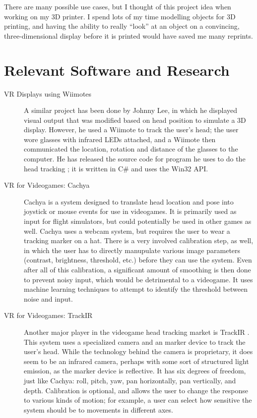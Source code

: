 There are many possible use cases, but I thought of this project idea
when working on my 3D printer. I spend lots of my time modelling
objects for 3D printing, and having the ability to really ``look'' at
an object on a convincing, three-dimensional display before it is
printed would have saved me many reprints.

\section{Relevant Software and Research}
\label{sec:sources}
\begin{description}
\item[VR Displays using Wiimotes] A similar project has been done by
  Johnny Lee, in which he displayed visual output that was modified
  based on head position to simulate a 3D display. However, he used a
  Wiimote to track the user's head; the user wore glasses with
  infrared LEDs attached, and a Wiimote then communicated the
  location, rotation and distance of the glasses to the computer. He
  has released the source code for program he uses to do the head
  tracking \citep{wiiproject}; it is written in C\# and uses the
  Win32 API.

\item[VR for Videogames: Cachya] Cachya \citep{cachya} is a system
  designed to translate head location and pose into joystick or mouse
  events for use in videogames. It is primarily used as input for
  flight simulators, but could potentially be used in other games as
  well. Cachya uses a webcam system, but requires the user to wear a
  tracking marker on a hat. There is a very involved calibration step,
  as well, in which the user has to directly manupulate various image
  parameters (contrast, brightness, threshold, etc.) before they can
  use the system. Even after all of this calibration, a significant
  amount of smoothing is then done to prevent noisy input, which would
  be detrimental to a videogame. It uses machine learning techniques
  to attempt to identify the threshold between noise and input.

\item[VR for Videogames: TrackIR] Another major player in the
  videogame head tracking market is TrackIR \citep{trackir}. This
  system uses a specialized camera and an marker device to track the
  user's head. While the technology behind the camera is proprietary,
  it does seem to be an infrared camera, perhaps with some sort of
  structured light emission, as the marker device is reflective. It
  has six degrees of freedom, just like Cachya: roll, pitch, yaw, pan
  horizontally, pan vertically, and depth. Calibration is optional,
  and allows the user to change the response to various kinds of
  motion; for example, a user can select how sensitive the system
  should be to movements in different axes.


\end{description}
